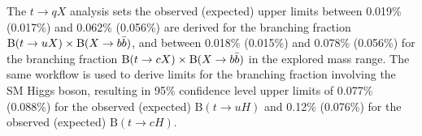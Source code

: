 The $t\to qX$ analysis sets the observed (expected) upper limits between 0.019\% (0.017\%) and 0.062\% (0.056\%) are derived for the branching fraction $\text{B}(t\to uX)\times\text{B}(X\to b\bar{b})$, and between 0.018\% (0.015\%) and 0.078\% (0.056\%) for the branching fraction $\text{B}(t\to cX)\times\text{B}(X\to b\bar{b})$ in the explored mass range. The same workflow is used to derive limits for the branching fraction involving the SM Higgs boson, resulting in 95\% confidence level upper limits of 0.077\% (0.088\%) for the observed (expected) $\text{B}(t\to uH)$ and 0.12\% (0.076\%) for the observed (expected) $\text{B}(t\to cH)$.

